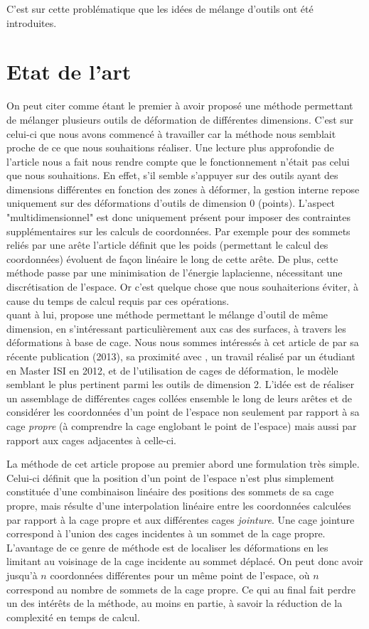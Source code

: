 C'est sur cette problématique que les idées de mélange d'outils ont
été introduites.

\section{Etat de l'art}

On peut citer \cite{JBPS11} comme étant le premier à avoir proposé une
méthode permettant de mélanger plusieurs outils de déformation de
différentes dimensions.  C'est sur celui-ci que nous avons commencé à
travailler car la méthode nous semblait proche de ce que nous
souhaitions réaliser. Une lecture plus approfondie de l'article nous a
fait nous rendre compte que le fonctionnement n'était pas celui que
nous souhaitions. En effet, s'il semble s'appuyer sur des outils ayant
des dimensions différentes en fonction des zones à déformer, la
gestion interne repose uniquement sur des déformations d'outils de
dimension 0 (points). L'aspect "multidimensionnel" est donc uniquement
présent pour imposer des contraintes supplémentaires sur les calculs
de coordonnées. Par exemple pour des sommets reliés par une arête
l'article définit que les poids (permettant le calcul des coordonnées)
évoluent de façon linéaire le long de cette arête. De plus, cette
méthode passe par une minimisation de l'énergie laplacienne,
nécessitant une discrétisation de l'espace. Or c'est quelque chose que
nous souhaiterions éviter, à cause du temps de calcul requis par ces
opérations.
\\

\cite{GPCP13} quant à lui, propose une méthode permettant le mélange
d'outil de même dimension, en s'intéressant particulièrement aux cas
des surfaces, à travers les déformations à base de cage.  Nous nous
sommes intéressés à cet article de par sa récente publication (2013),
sa proximité avec \cite{Hur12}, un travail réalisé par un étudiant en
Master ISI en 2012, et de l'utilisation de cages de déformation, le
modèle semblant le plus pertinent parmi les outils de dimension 2.
L'idée est de réaliser un assemblage de différentes cages collées
ensemble le long de leurs arêtes et de considérer les coordonnées d'un
point de l'espace non seulement par rapport à sa cage \textit{propre}
(à comprendre la cage englobant le point de l'espace) mais aussi par
rapport aux cages adjacentes à celle-ci.

La méthode de cet article propose au premier abord une formulation
très simple. Celui-ci définit que la position d'un point de l'espace
n'est plus simplement constituée d'une combinaison linéaire des
positions des sommets de sa cage propre, mais résulte d'une
interpolation linéaire entre les coordonnées calculées par rapport à
la cage propre et aux différentes cages \textit{jointure}. Une cage
jointure correspond à l'union des cages incidentes à un sommet de la
cage propre. L'avantage de ce genre de méthode est de localiser les
déformations en les limitant au voisinage de la cage incidente au
sommet déplacé. On peut donc avoir jusqu'à $n$ coordonnées différentes
pour un même point de l'espace, où $n$ correspond au nombre de sommets
de la cage propre. Ce qui au final fait perdre un des intérêts de la
méthode, au moins en partie, à savoir la réduction de la complexité en
temps de calcul.

